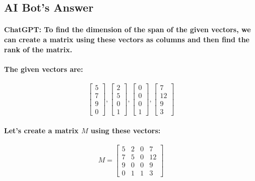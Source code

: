 \documentclass[11pt]{article} %
\begin{document}
\subsection{AI Bot's Answer}
\begin{mdframed}[
        backgroundcolor=white,  %
        linecolor=black,        %
        leftmargin=5pt,         %
        rightmargin=5pt,        %
        linewidth=2pt           %
    ]
    \paragraph{\textbf{ChatGPT}: To find the dimension of the span of the given vectors, we can create a matrix using these vectors as columns and then find the rank of the matrix.}
    \paragraph{The given vectors are:}
    \[
        \begin{bmatrix}
            5 \\
            7 \\
            9 \\
            0
        \end{bmatrix},
        \begin{bmatrix}
            2 \\
            5 \\
            0 \\
            1
        \end{bmatrix},
        \begin{bmatrix}
            0 \\
            0 \\
            0 \\
            1
        \end{bmatrix},
        \begin{bmatrix}
            7  \\
            12 \\
            9  \\
            3
        \end{bmatrix}
    \]
    \paragraph{Let's create a matrix \(M\) using these vectors:}

    \[ M = \begin{bmatrix}
            5 & 2 & 0 & 7  \\
            7 & 5 & 0 & 12 \\
            9 & 0 & 0 & 9  \\
            0 & 1 & 1 & 3
        \end{bmatrix} \]

\end{mdframed}
\end{document}

